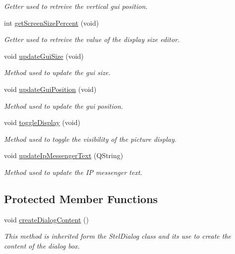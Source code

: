 \begin{DoxyCompactItemize}
\begin{DoxyCompactList}\small\item\em Getter used to retreive the vertical gui position. \end{DoxyCompactList}\item 
int \mbox{\hyperlink{class_autoscope_window_form_a51b6c47d99b53207d9e65157f01270ff}{get\+Screen\+Size\+Percent}} (void)
\begin{DoxyCompactList}\small\item\em Getter used to retreive the value of the display size editor. \end{DoxyCompactList}\item 
void \mbox{\hyperlink{class_autoscope_window_form_af62e38bc2170d8504f63f07e5d0b4943}{update\+Gui\+Size}} (void)
\begin{DoxyCompactList}\small\item\em Method used to update the gui size. \end{DoxyCompactList}\item 
void \mbox{\hyperlink{class_autoscope_window_form_aada2c3ef979ce1718bb981490f6c7495}{update\+Gui\+Position}} (void)
\begin{DoxyCompactList}\small\item\em Method used to update the gui position. \end{DoxyCompactList}\item 
void \mbox{\hyperlink{class_autoscope_window_form_adfa249163e1c2a72485c24a575a67efb}{toggle\+Display}} (void)
\begin{DoxyCompactList}\small\item\em Method used to toggle the visibility of the picture display. \end{DoxyCompactList}\item 
void \mbox{\hyperlink{class_autoscope_window_form_a38a4a73945cffab764db46b8deec800a}{update\+Ip\+Messenger\+Text}} (Q\+String)
\begin{DoxyCompactList}\small\item\em Method used to update the IP messenger text. \end{DoxyCompactList}\end{DoxyCompactItemize}
\subsection*{Protected Member Functions}
\begin{DoxyCompactItemize}
\item 
void \mbox{\hyperlink{class_autoscope_window_form_ab48246f0892a43963b7d209dc3bf4b4f}{create\+Dialog\+Content}} ()
\begin{DoxyCompactList}\small\item\em This method is inherited form the Stel\+Dialog class and it\textquotesingle{}s use to create the content of the dialog box. \end{DoxyCompactList}\end{DoxyCompactItemize}
